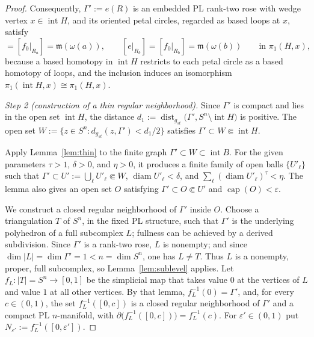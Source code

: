 \documentclass[12pt,oneside,a4paper]{article}
\theoremstyle{mytheorem}
\theoremstyle{remark}
\theoremstyle{definition}
\begin{document}
\begin{proof}
Consequently, $\Gamma':=e(R)$ is an embedded PL rank-two rose with wedge
vertex $x\in\operatorname{int}H$, and its oriented petal circles, regarded as
based loops at $x$, satisfy
\begin{equation*}
[e|_{R_a}]=[f_0|_{R_a}]=\mathfrak{m}(\omega(a)),
\qquad
[e|_{R_b}]=[f_0|_{R_b}]=\mathfrak{m}(\omega(b))
\qquad\text{in }\pi_1(H,x),
\end{equation*}
because a based homotopy in $\operatorname{int}H$ restricts to each petal
circle as a based homotopy of loops, and the inclusion induces an isomorphism
$\pi_1(\operatorname{int}H,x)\cong\pi_1(H,x)$.


\smallskip\noindent\emph{Step 2 (construction of a thin regular neighborhood).}
Since $\Gamma'$ is compact and lies in the open set
$\operatorname{int}H$, the distance
$d_1:=\operatorname{dist}_{g_{st}}
 \bigl(\Gamma',S^n\setminus\operatorname{int}H\bigr)$ is positive.  The open set
$W:=\{z\in S^n:d_{g_{st}}(z,\Gamma')<d_1/2\}$ satisfies
$\Gamma'\subset W\Subset\operatorname{int}H$.

Apply Lemma~\ref{lem:thin} to the finite graph
$\Gamma'\subset W\subset\operatorname{int}B$.  For
the given parameters $\tau>1$, $\delta>0$, and $\eta>0$, it produces a
finite family of open balls $\{U'_\ell\}$ such that
\(\Gamma' \subset U' := \bigcup_\ell U'_\ell \Subset W\),
\(\operatorname{diam}U'_\ell<\delta\),
and
\(\sum_\ell(\operatorname{diam}U'_\ell)^\tau<\eta\).
The lemma also gives an open set $O$ satisfying
\(\Gamma'\subset O\Subset U'\)
and
\(\operatorname{cap}(O)<\varepsilon\).

We construct a closed regular neighborhood of $\Gamma'$ inside $O$.
Choose a triangulation $T$ of $S^n$, in the fixed PL structure, such
that $\Gamma'$ is the underlying polyhedron of a full subcomplex $L$;
fullness can be achieved by a derived subdivision.  Since $\Gamma'$ is
a rank-two rose, $L$ is nonempty; and since
$\dim|L|=\dim\Gamma'=1<n=\dim S^n$, one has $L\ne T$.  Thus $L$ is a
nonempty, proper, full subcomplex, so Lemma~\ref{lem:sublevel} applies.  Let
$f_L:|T|=S^n\to[0,1]$ be the simplicial map that takes value $0$ at the
vertices of $L$ and value $1$ at all other vertices.  By that lemma,
$f_L^{-1}(0)=\Gamma'$, and, for every $c\in(0,1)$, the set
$f_L^{-1}([0,c])$ is a closed regular neighborhood of $\Gamma'$ and a
compact PL $n$-manifold, with
$\partial\bigl(f_L^{-1}([0,c])\bigr)=f_L^{-1}(c).$
For $\varepsilon'\in(0,1)$ put
$N_{\varepsilon'}:=f_L^{-1}([0,\varepsilon'])$.




\end{proof}
\end{document}
